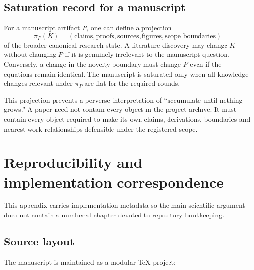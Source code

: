 \documentclass[11pt]{article}
\begin{document}
\subsection{Saturation record for a manuscript}

For a manuscript artifact \(P\), one can define a projection
\[
\pi_P(K)=
(\text{claims},\text{proofs},\text{sources},\text{figures},\text{scope boundaries})
\]
of the broader canonical research state. A literature discovery may change \(K\) without changing \(P\) if it is genuinely irrelevant to the manuscript question. Conversely, a change in the novelty boundary must change \(P\) even if the equations remain identical. The manuscript is saturated only when all knowledge changes relevant under \(\pi_P\) are flat for the required rounds.

This projection prevents a perverse interpretation of ``accumulate until nothing grows.'' A paper need not contain every object in the project archive. It must contain every object required to make its own claims, derivations, boundaries and nearest-work relationships defensible under the registered scope.

\section{Reproducibility and implementation correspondence}

This appendix carries implementation metadata so the main scientific argument does not contain a numbered chapter devoted to repository bookkeeping.

\subsection{Source layout}

The manuscript is maintained as a modular TeX project:
\end{document}
